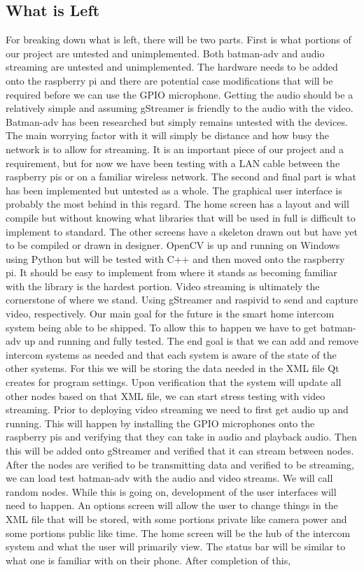 \documentclass[onecolumn, draftclsnofoot,10pt, compsoc]{IEEEtran}
\begin{document}
\subsection{What is Left}
For breaking down what is left, there will be two parts. First is what portions of our project are untested and unimplemented. Both batman-adv and audio streaming are untested and unimplemented. The hardware needs to be added onto the raspberry pi and there are potential case modifications that will be required before we can use the GPIO microphone. Getting the audio should be a relatively simple and assuming gStreamer is friendly to the audio with the video. Batman-adv has been researched but simply remains untested with the devices. The main worrying factor with it will simply be distance and how busy the network is to allow for streaming. It is an important piece of our project and a requirement, but for now we have been testing with a LAN cable between the raspberry pis or on a familiar wireless network. The second and final part is what has been implemented but untested as a whole. The graphical user interface is probably the most behind in this regard. The home screen has a layout and will compile but without knowing what libraries that will be used in full is difficult to implement to standard. The other screens have a skeleton drawn out but have yet to be compiled or drawn in designer. OpenCV is up and running on Windows using Python but will be tested with C++ and then moved onto the raspberry pi. It should be easy to implement from where it stands as becoming familiar with the library is the hardest portion. Video streaming is ultimately the cornerstone of where we stand. Using gStreamer and raspivid to send and capture video, respectively. Our main goal for the future is the smart home intercom system being able to be shipped. To allow this to happen we have to get batman-adv up and running and fully tested. The end goal is that we can add and remove intercom systems as needed and that each system is aware of the state of the other systems. For this we will be storing the data needed in the XML file Qt creates for program settings. Upon verification that the system will update all other nodes based on that XML file, we can start stress testing with video streaming. Prior to deploying video streaming we need to first get audio up and running. This will happen by installing the GPIO microphones onto the raspberry pis and verifying that they can take in audio and playback audio. Then this will be added onto gStreamer and verified that it can stream between nodes. After the nodes are verified to be transmitting data and verified to be streaming, we can load test batman-adv with the audio and video streams. We will call random nodes. While this is going on, development of the user interfaces will need to happen. An options screen will allow the user to change things in the XML file that will be stored, with some portions private like camera power and some portions public like time. The home screen will be the hub of the intercom system and what the user will primarily view. The status bar will be similar to what one is familiar with on their phone. After completion of this, 
\end{document}
